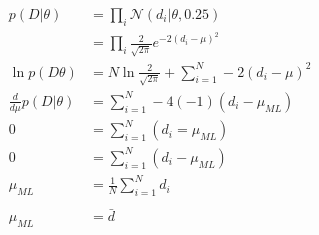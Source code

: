 \documentclass{article}
\begin{document}
\begin{align}
p(D|\theta) &= \prod_i \mathcal{N}(d_i|\theta, 0.25)\\
&= \prod_i \frac{2}{\sqrt{2 \pi}} e^{-2(d_i - \mu)^2}\\
 \ln p(D\theta) &= N\ln \frac{2}{\sqrt{2 \pi}}+ \sum_{i=1}^N-2(d_i-\mu)^2\\
\frac{d}{d\mu}p(D|\theta) &= \sum_{i=1}^N-4(-1)(d_i-\mu_{ML})\\
0 &= \sum_{i=1}^N(d_i=\mu_{ML})\\
0 &= \sum_{i=1}^N(d_i-\mu_{ML})\\
\mu_{ML} &= \frac{1}{N}\sum_{i=1}^Nd_i \\\\
\mu_{ML} &= \bar{d}
\end{align}
\end{document}
